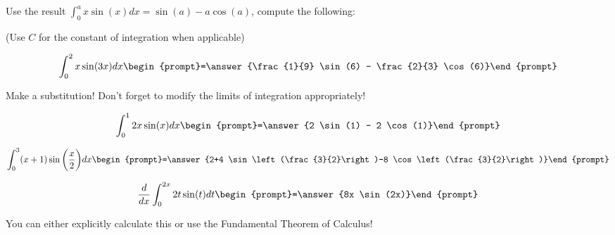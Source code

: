 \documentclass{ximera}
\author{Jim Talamo}
\begin{document}
\begin{exercise}
Use the result $ \int_0^a x \sin(x) dx = \sin(a)-a \cos(a)$, compute the following:

\begin{prompt} (Use $C$ for the constant of integration when applicable) \end{prompt}

\[
 \int_0^2 x \sin(3x) dx \begin{prompt}=\answer{\frac{1}{9} \sin(6) -
    \frac{2}{3} \cos(6)}\end{prompt}
\]

\begin{hint}
Make a substitution!  Don't forget to modify the limits of integration appropriately!
\end{hint}

\[
 \int_0^1 2x \sin(x) dx \begin{prompt}=\answer{2 \sin(1) - 2 \cos(1)}\end{prompt}
\]

\[
 \int_0^3 (x+1) \sin\bigg(\frac{x}{2}\bigg) dx \begin{prompt}=\answer{2+4 \sin\left(\frac{3}{2}\right)-8 \cos\left(\frac{3}{2}\right)}\end{prompt}
 \]

\[
\frac{d}{dx}  \int_0^{2x} 2t \sin(t) dt  \begin{prompt}=\answer{8x \sin(2x)}\end{prompt}
\]
\begin{hint}
You can either explicitly calculate this or use the Fundamental Theorem of Calculus!
\end{hint}

\end{exercise}
\end{document}
